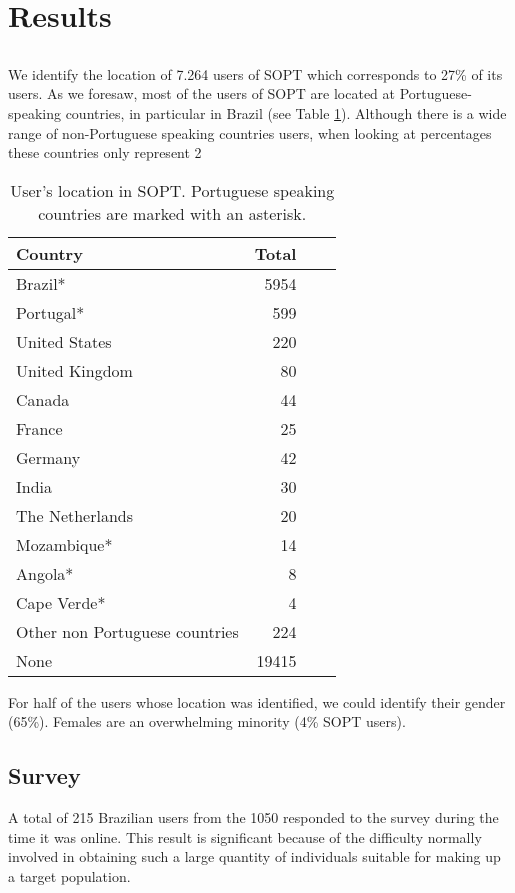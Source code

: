 \section{Results}
\subsection{}
\noindent We identify the location of 7.264 users of SOPT which corresponds to 27\% of its users. As we foresaw, most of the users of SOPT are located at Portuguese-speaking countries, in particular in Brazil (see Table \ref{tbl:Locations}). Although there is a wide range of non-Portuguese speaking countries users, when looking at percentages these countries only represent 2%

\begin{table}[ht]
\begin{center}
\scriptsize{
\begin{tabular}{lrrr}
Country & Total \\
\hline
Brazil* 			& 5954 \\
Portugal* 			& 599 \\
United States 		& 220 \\
United Kingdom      & 80 \\
Canada				& 44 \\
France              & 25 \\
Germany				& 42 \\
India				& 30 \\
The Netherlands		& 20 \\
Mozambique*		    & 14 \\
Angola*		 		& 8 \\
Cape Verde*		    & 4 \\
Other non Portuguese countries		 & 224 \\
None 				& 19415 \\
\end{tabular}
\caption{User's location in SOPT. Portuguese speaking countries are marked with an asterisk.}
\label{tbl:Locations}
}
\end{center}
\end{table}

For half of the users whose location was identified, we could identify their gender (65\%). Females are an overwhelming minority (4\% SOPT users).

\subsection{Survey}
\noindent A total of 215 Brazilian users from the 1050 responded to the survey during the time it was online. This result is significant because of the difficulty normally involved in obtaining such a large quantity of individuals suitable for making up a target population. 

